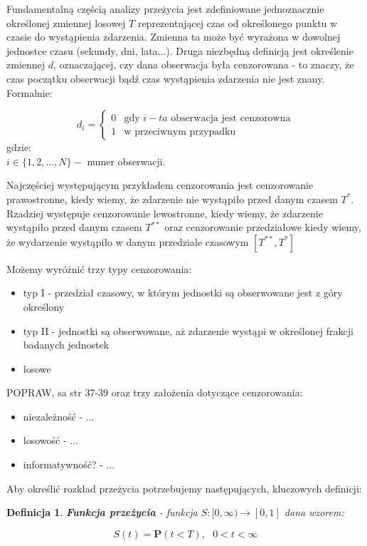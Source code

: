 \documentclass[]{pracamgr}
\newtheorem{defi}{Definicja}[section]
\begin{document}
Fundamentalną częścią analizy przeżycia jest zdefiniowane jednoznacznie określonej zmiennej losowej $T$ reprezentującej czas od określonego punktu w czasie do wystąpienia zdarzenia. Zmienna ta może być wyrażona w dowolnej jednostce czasu (sekundy, dni, lata...). Druga niezbędną definicją jest określenie zmiennej $d$, oznaczającej, czy dana obserwacja była cenzorowana - to znaczy, że czas początku obserwacji bądź czas wystąpienia zdarzenia nie jest znany. Formalnie:

\begin{equation} 
d_{i} = \begin {cases} 0 &\text{gdy $i-ta$ obserwacja jest cenzorowna}\\ 1 &\text{w przeciwnym przypadku} \end{cases} 
\end{equation} 
gdzie: \\
$i \in \{1,2,...,N\} - $ numer obserwacji.

Najczęściej występującym przykładem cenzorowania jest cenzorowanie prawostronne, kiedy wiemy, że zdarzenie nie wystąpiło przed danym czasem $T^{*}$. Rzadziej występuje cenzorowanie lewostronne, kiedy wiemy, że zdarzenie wystąpiło przed danym czasem  $T^{**}$ oraz cenzorowanie przedziałowe  kiedy wiemy, że wydarzenie wystąpiło w danym przedziale czasowym $[T^{**}, T^{*}]$


Możemy wyróżnić trzy typy cenzorowania:
\begin{itemize}
\item typ I - przedział czasowy, w którym jednostki są obserwowane jest z góry określony
\item typ II - jednostki są obserwowane, aż zdarzenie wystąpi w określonej frakcji badanych jednostek
\item losowe
\end{itemize}

{\large{\color{red}POPRAW, {sa} str 37-39}}
oraz trzy założenia dotyczące cenzorowania:
\begin{itemize}
\item niezależność - ...
\item losowość - ...
\item {\color{red} informatywność?} - ...
\end{itemize}

Aby określić rozkład przeżycia potrzebujemy następujących, kluczowych definicji:
\begin{defi}\label{funkcja przeżycia}
\textbf{Funkcja przeżycia} - funkcja $S:[0,\infty) \to [0,1]$ dana wzorem:

$$S(t) = \mathbf{P}(t < T), \ \ \ 0 < t < \infty $$
\end{defi}
\end{document}
